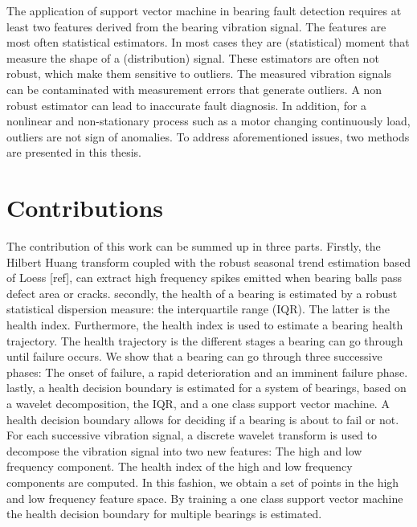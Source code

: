 \documentclass[../Main/thesis.tex]{subfiles}
\begin{document}
\justify
\justify
The application of support vector machine in bearing fault detection requires at least two features derived from the bearing vibration signal. The features are most often statistical estimators. In most cases they are (statistical) moment that measure the shape of a (distribution) signal. These estimators are often not robust, which make them sensitive to outliers. The measured vibration signals can be contaminated with measurement errors that generate outliers. A non robust estimator can lead to inaccurate fault diagnosis. In addition, for a nonlinear and non-stationary process such as a motor changing continuously load, outliers are not sign of anomalies. To address aforementioned issues, two methods are presented in this thesis. 





\section{Contributions }
\label{sec:contributions}
The contribution of this work can be summed up in three parts. Firstly, the Hilbert Huang transform coupled with the robust seasonal trend estimation based of Loess [ref], can extract high frequency spikes emitted when bearing balls pass defect area or cracks.
\justify
secondly, the health of a bearing is estimated by a robust statistical dispersion measure: the interquartile range (IQR). The latter is the health index. Furthermore,  the health index is used to estimate a bearing health trajectory. The health trajectory is the different stages a bearing can go through until failure occurs. We show that a bearing can go through three successive phases: The onset of failure, a rapid deterioration and an imminent failure phase. 
\justify
lastly, a health decision boundary is estimated for a system of bearings, based on a wavelet decomposition, the IQR, and a one class support vector machine. A health decision boundary allows for deciding if a bearing is about to fail or not. For each successive vibration signal, a discrete wavelet transform is used to decompose the vibration signal into two new features: The high and low frequency component. The health index of the high and low frequency components are computed. In this fashion, we obtain a set of points in the high and low frequency feature space. By training a one class support vector machine the health decision boundary for multiple bearings is estimated.


\blankpage
\end{document}
